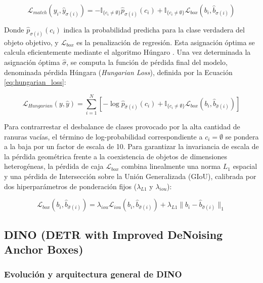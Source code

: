 \begin{equation}
    \mathcal{L}_{match}(y_i, \hat{y}_{\sigma(i)}) = - \mathbb{I}_{\{c_i \neq \emptyset\}} \hat{p}_{\sigma(i)}(c_i) + \mathbb{I}_{\{c_i \neq \emptyset\}} \mathcal{L}_{box}(b_i, \hat{b}_{\sigma(i)})
    \label{eq:l_match_detr}
\end{equation}

Donde $\hat{p}_{\sigma(i)}(c_i)$ indica la probabilidad predicha para la clase verdadera del objeto objetivo, y $\mathcal{L}_{box}$ es la penalización de regresión. Esta asignación óptima se calcula eficientemente mediante el algoritmo Húngaro \cite{carion2020end}. Una vez determinada la asignación óptima $\hat{\sigma}$, se computa la función de pérdida final del modelo, denominada pérdida Húngara (\textit{Hungarian Loss}), definida por la Ecuación \ref{eq:hungarian_loss}:

\begin{equation}
    \mathcal{L}_{Hungarian}(y, \hat{y}) = \sum_{i=1}^N \left[ -\log \hat{p}_{\hat{\sigma}(i)}(c_i) + \mathbb{I}_{\{c_i \neq \emptyset\}} \mathcal{L}_{box}(b_i, \hat{b}_{\hat{\sigma}(i)}) \right]
    \label{eq:hungarian_loss}
\end{equation}

Para contrarrestar el desbalance de clases provocado por la alta cantidad de ranuras vacías, el término de log-probabilidad correspondiente a $c_i = \emptyset$ se pondera a la baja por un factor de escala de 10. Para garantizar la invariancia de escala de la pérdida geométrica frente a la coexistencia de objetos de dimensiones heterogéneas, la pérdida de caja $\mathcal{L}_{box}$ combina linealmente una norma $L_1$ espacial y una pérdida de Intersección sobre la Unión Generalizada (GIoU), calibrada por dos hiperparámetros de ponderación fijos ($\lambda_{L1}$ y $\lambda_{iou}$):

\begin{equation}
    \mathcal{L}_{box}(b_i, \hat{b}_{\hat{\sigma}(i)}) = \lambda_{iou} \mathcal{L}_{iou}(b_i, \hat{b}_{\hat{\sigma}(i)}) + \lambda_{L1} \|b_i - \hat{b}_{\hat{\sigma}(i)}\|_1
    \label{eq:l_box_formulation}
\end{equation}

\subsection{DINO (DETR with Improved DeNoising Anchor Boxes)}

\subsubsection{Evolución y arquitectura general de DINO}

